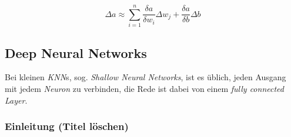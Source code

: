 \begin{equation}\label{eq:part_der}
\Delta a \approx \sum_{i=1}^{n} \frac{\delta a}{\delta w_i}\Delta w_j + \frac{\delta a}{\delta b}\Delta b
\end{equation}

\subsection[DNNs]{Deep Neural Networks}\label{cha:theo:dl}

Bei kleinen \textit{KNN}s, sog. \textit{Shallow Neural Networks}, ist es üblich, jeden Ausgang mit jedem \textit{Neuron} zu verbinden, die Rede ist dabei von einem \textit{fully connected Layer}.

\subsubsection{Einleitung (Titel löschen)}


















